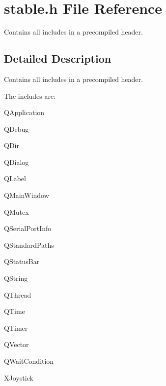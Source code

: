\hypertarget{a00021}{}\section{stable.\+h File Reference}
\label{a00021}


Contains all includes in a precompiled header.  




\subsection{Detailed Description}
Contains all includes in a precompiled header. 

The includes are\+:
\begin{DoxyItemize}
\item Q\+Application
\item Q\+Debug
\item Q\+Dir
\item Q\+Dialog
\item Q\+Label
\item Q\+Main\+Window
\item Q\+Mutex
\item Q\+Serial\+Port\+Info
\item Q\+Standard\+Paths
\item Q\+Status\+Bar
\item Q\+String
\item Q\+Thread
\item Q\+Time
\item Q\+Timer
\item Q\+Vector
\item Q\+Wait\+Condition
\item X\+Joystick 
\end{DoxyItemize}